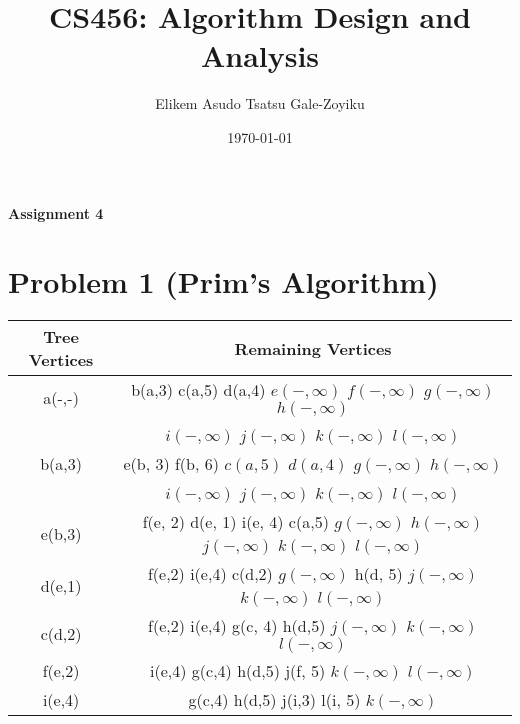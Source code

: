 \documentclass{article}
\title{\textbf{CS456: Algorithm Design and Analysis}}
\author{Elikem Asudo Tsatsu Gale-Zoyiku}
\date{\today}
\begin{document}
\doublespacing
\maketitle
\begin{center}
    \begin{large}
        \textbf{Assignment 4\\}
    \end{large}
\end{center}
\newpage

\section*{Problem 1 (Prim's Algorithm)}
\begin{table}[ht]
    \centering
    \begin{tabular}{|c|c|}
        \hline
        \textbf{Tree Vertices} & \textbf{Remaining Vertices}                                                                          \\
        \hline
        a(-,-)                 & b(a,3) c(a,5) d(a,4) $e(-,\infty)$ $f(-,\infty)$ $g(-,\infty)$ $h(-,\infty)$                         \\
                               & $i(-,\infty)$ $j(-,\infty)$ $k(-,\infty)$ $l(-,\infty)$                                              \\
        \hline
        b(a,3)                 & e(b, 3) f(b, 6) $c(a,5)$ $d(a,4)$ $g(-,\infty)$ $h(-,\infty)$                                        \\
                               & $i(-,\infty)$ $j(-,\infty)$ $k(-,\infty)$ $l(-,\infty)$                                              \\
        \hline
        e(b,3)                 & f(e, 2) d(e, 1) i(e, 4) c(a,5) $g(-,\infty)$ $h(-,\infty)$ $j(-,\infty)$ $k(-,\infty)$ $l(-,\infty)$ \\
        \hline
        d(e,1)                 & f(e,2) i(e,4) c(d,2) $g(-,\infty)$ h(d, 5) $j(-,\infty)$ $k(-,\infty)$ $l(-,\infty)$                 \\
        \hline
        c(d,2)                 & f(e,2) i(e,4) g(c, 4) h(d,5) $j(-,\infty)$ $k(-,\infty)$ $l(-,\infty)$                               \\
        \hline
        f(e,2)                 & i(e,4) g(c,4) h(d,5) j(f, 5) $k(-,\infty)$ $l(-,\infty)$                                             \\
        \hline
        i(e,4)                 & g(c,4) h(d,5) j(i,3) l(i, 5) $k(-,\infty)$                                                           \\

\end{tabular}
\end{table}
\end{document}
